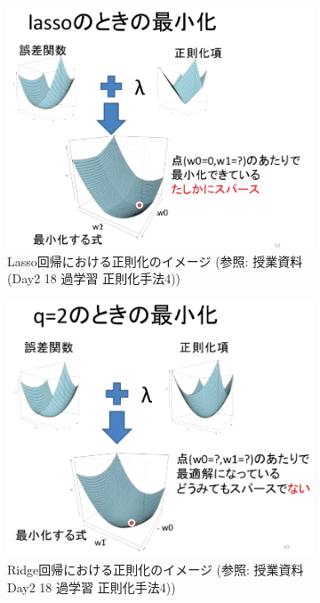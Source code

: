 \documentclass{ltjsarticle}
\begin{document}
\begin{figure}[ht]
  \centering
  \begin{subfigure}[b]{0.45\textwidth}
    \centering
    \includegraphics[width=\textwidth]{./capture/Lasso.png}
    \caption{Lasso回帰における正則化のイメージ (参照: 授業資料(Day2 18 過学習 正則化手法4))}
    \label{fig:Lasso}
  \end{subfigure}
  \hfill
  \begin{subfigure}[b]{0.45\textwidth}
    \centering
    \includegraphics[width=\textwidth]{./capture/Ridge.png}
    \caption{Ridge回帰における正則化のイメージ (参照: 授業資料 Day2 18 過学習 正則化手法4))}
    \label{fig:Ridge}
  \end{subfigure}
  \caption{}
\end{figure}
\end{document}
